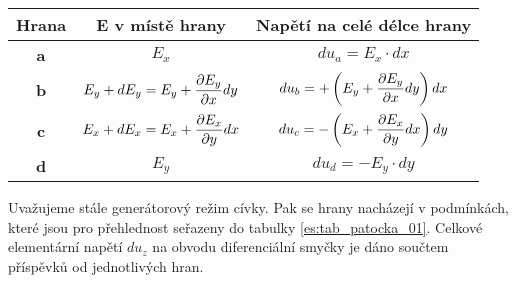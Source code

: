         \begin{table*}[ht!]
          \centering
          \begin{tabular}{|c|c|c|}
            \rowcolor[HTML]{FFFFC7}
            \hline Hrana      & E v místě hrany 
                              & Napětí na celé délce hrany                                     \\ 
            \hline \textbf{a} & \(E_x\)
                              & \(du_a=E_x\cdot dx\)                                           \\ 
            \hline \textbf{b} & \(E_y+dE_y = E_y + \dfrac{\partial E_y}{\partial x}dy\) 
                              & \(du_b= +\left(E_y + \dfrac{\partial E_y}{\partial x}dy\right)dx\)                \\ 
            \hline \textbf{c} & \(E_x+dE_x = E_x + \dfrac{\partial E_x}{\partial y}dx\)
                              & \(du_c= -\left(E_x + \dfrac{\partial E_x}{\partial y}dx\right)dy\)                \\ 
            \hline \textbf{d} & \(E_y\)                              
                              & \(du_d= - E_y\cdot dy\)                                        \\ 
            \hline 
          \end{tabular} 
          \caption{Podmínky, ve kterých se nacházejí hrany \(a, b, c, d\) diferenciální plochy 
                   \(dS_z\). Znaménko je vztaženo vůči zvolenému směru oběhu.}
          \label{es:tab_patocka_01}
        \end{table*}
        
        Uvažujeme stále generátorový režim cívky. Pak se hrany nacházejí v podmínkách, které jsou 
        pro přehlednost seřazeny do tabulky \ref{es:tab_patocka_01}. Celkové elementární napětí 
        \(du_z\) na obvodu diferenciální smyčky je dáno součtem příspěvků od jednotlivých hran.
        

